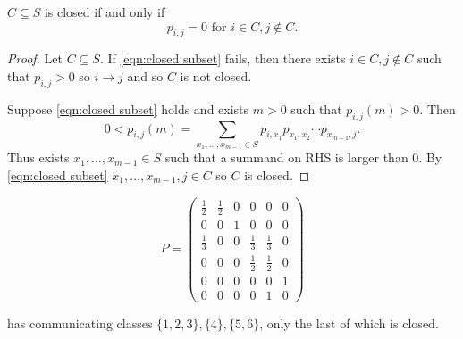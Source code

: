 \documentclass[a4paper]{article}
\begin{document}
\begin{proposition}
  \(C \subseteq S\) is closed if and only if
  \begin{equation}
    \label{eqn:closed subset}
    p_{i,j}=0 \text{ for } i\in C, j\notin C.
    \tag{\(\ast\)}
    \end{equation}
\end{proposition}

\begin{proof}
  Let \(C \subseteq S\). If \eqref{eqn:closed subset} fails, then there exists \(i\in C, j\notin C\) such that \(p_{i,j}>0\) so \(i\to j\) and so \(C\) is not closed.

  Suppose \eqref{eqn:closed subset} holds and exists \(m>0\) such that \(p_{i,j}(m) >0\). Then
  \[
0 < p_{i,j}(m) = \sum_{x_1,\ldots,x_{m-1}\in S} p_{i,x_1}p_{x_1,x_2}\cdots p_{x_{m-1},j}.
  \]
  Thus exists \(x_1,\ldots,x_{m-1}\in S\) such that a summand on RHS is larger than \(0\). By \eqref{eqn:closed subset} \(x_1,\ldots,x_{m-1},j \in C\) so \(C\) is closed.
\end{proof}

\begin{eg}
  \begin{minipage}[t]{0.45\textwidth}
  \[
    P=
    \begin{pmatrix}
      \frac{1}{2} & \frac{1}{2} & 0& 0&0 &0 \\
      0& 0&1&0&0&0 \\
      \frac{1}{3} &0&0&\frac{1}{3} & \frac{1}{3} &0 \\
      0&0&0&\frac{1}{2}&\frac{1}{2}& 0 \\
      0&0&0&0&0& 1 \\
      0&0&0&0&1&0
    \end{pmatrix}
  \]
\end{minipage}
\hfill
\begin{minipage}[t]{0.45\linewidth}
  \begin{center}
  \end{center}
\end{minipage}
  has communicating classes \(\{1,2,3\}, \{4\},\{5,6\}\), only the last of which is closed.
\end{eg}
\end{document}
